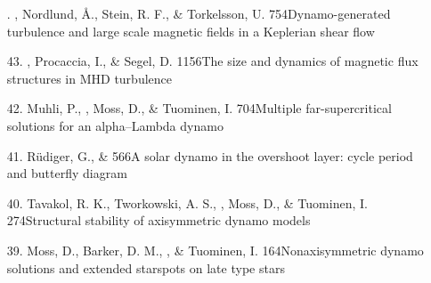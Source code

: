 \begin{itemize}
\item[\important 44.]
\Brandenburg, Nordlund, \AA., Stein, R. F., \& Torkelsson, U.
{754}{Dynamo-generated turbulence and large scale magnetic fields
in a Keplerian shear flow}

\item[43.]
\Brandenburg, Procaccia, I., \& Segel, D.
{1156}{The size and dynamics of magnetic flux structures in MHD turbulence}

\item[42.]
Muhli, P., \Brandenburg, Moss, D., \& Tuominen, I.
{704}{Multiple far-supercritical solutions for an alpha--Lambda  dynamo}

\item[41.]
R\"udiger, G., \& \Brandenburg{}
{566}{A solar dynamo in the overshoot layer:
cycle period and butterfly diagram}

\item[40.]
Tavakol, R. K., Tworkowski, A. S., \Brandenburg, Moss, D., \&
Tuominen, I.
{274}{Structural stability of axisymmetric dynamo models}

\item[39.]
Moss, D., Barker, D. M., \Brandenburg, \& Tuominen, I.
{164}{Nonaxisymmetric dynamo solutions and extended starspots on late type stars}


\end{itemize}

